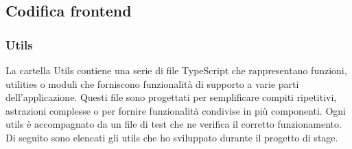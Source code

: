 \subsection{Codifica frontend}\label{subsec:codifica-front-end}

\subsubsection{Utils}\label{subsubsec:utils}
La cartella Utils contiene una serie di file TypeScript che rappresentano funzioni, utilities o moduli che forniscono funzionalità di supporto a varie parti dell'applicazione.
Questi file sono progettati per semplificare compiti ripetitivi, astrazioni complesse o per fornire funzionalità condivise in più componenti. Ogni utils è accompagnato 
da un file di test che ne verifica il corretto funzionamento.\\
Di seguito sono elencati gli utils che ho sviluppato durante il progetto di stage.

